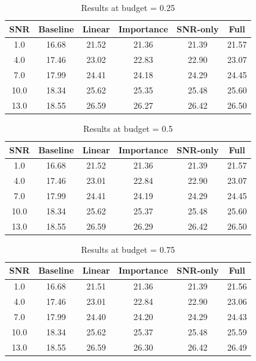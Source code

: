 \begin{table}[h]
\centering
\caption{Results at budget = 0.25}
\begin{tabular}{c|ccccc}
\hline
SNR & Baseline & Linear & Importance & SNR-only & Full \\
\hline
1.0 & 16.68 & 21.52 & 21.36 & 21.39 & 21.57 \\
4.0 & 17.46 & 23.02 & 22.83 & 22.90 & 23.07 \\
7.0 & 17.99 & 24.41 & 24.18 & 24.29 & 24.45 \\
10.0 & 18.34 & 25.62 & 25.35 & 25.48 & 25.60 \\
13.0 & 18.55 & 26.59 & 26.27 & 26.42 & 26.50 \\
\hline
\end{tabular}
\end{table}

\begin{table}[h]
\centering
\caption{Results at budget = 0.5}
\begin{tabular}{c|ccccc}
\hline
SNR & Baseline & Linear & Importance & SNR-only & Full \\
\hline
1.0 & 16.68 & 21.52 & 21.36 & 21.39 & 21.57 \\
4.0 & 17.46 & 23.01 & 22.84 & 22.90 & 23.07 \\
7.0 & 17.99 & 24.41 & 24.19 & 24.29 & 24.45 \\
10.0 & 18.34 & 25.62 & 25.37 & 25.48 & 25.60 \\
13.0 & 18.55 & 26.59 & 26.29 & 26.42 & 26.50 \\
\hline
\end{tabular}
\end{table}

\begin{table}[h]
\centering
\caption{Results at budget = 0.75}
\begin{tabular}{c|ccccc}
\hline
SNR & Baseline & Linear & Importance & SNR-only & Full \\
\hline
1.0 & 16.68 & 21.51 & 21.36 & 21.39 & 21.56 \\
4.0 & 17.46 & 23.01 & 22.84 & 22.90 & 23.06 \\
7.0 & 17.99 & 24.40 & 24.20 & 24.29 & 24.43 \\
10.0 & 18.34 & 25.62 & 25.37 & 25.48 & 25.59 \\
13.0 & 18.55 & 26.59 & 26.30 & 26.42 & 26.49 \\
\hline
\end{tabular}
\end{table}

